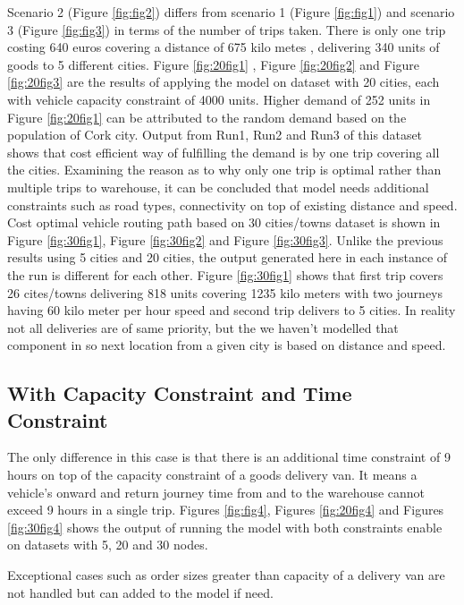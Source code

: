 \documentclass[a4paper,11pt]{article}
\begin{document}
Scenario 2 (Figure \ref{fig:fig2}) differs from scenario 1 (Figure \ref{fig:fig1}) and scenario 3 (Figure \ref{fig:fig3}) in terms of the number of trips taken. There is only one trip costing 640 euros covering a distance of 675 kilo metes , delivering 340 units of goods to 5 different cities. 
Figure \ref{fig:20fig1} , Figure \ref{fig:20fig2}  and Figure \ref{fig:20fig3} are the results of applying the model on dataset with 20 cities, each with vehicle capacity constraint of 4000 units. Higher demand of 252 units in Figure \ref{fig:20fig1} can be attributed to the random demand based on the population of Cork city. Output from Run1, Run2 and Run3 of this dataset shows that cost efficient way of fulfilling the demand is by one trip covering all the cities.
Examining the reason as to why only one trip is optimal rather than multiple trips to warehouse, it can be concluded that model needs additional constraints such as road types, connectivity on top of existing distance and speed.\\

Cost optimal vehicle routing path based on 30 cities/towns dataset is shown in Figure \ref{fig:30fig1}, Figure \ref{fig:30fig2} and Figure \ref{fig:30fig3}. Unlike the previous results using 5 cities and 20 cities, the output generated here in each instance of the run is different for each other. Figure \ref{fig:30fig1} shows that first trip covers 26 cites/towns delivering 818 units covering 1235 kilo meters with two journeys having 60 kilo meter per hour speed and second trip delivers to 5 cities. In reality not all deliveries are of same priority, but the we haven't modelled that component in so next location from a given city is based on distance and speed.  

\subsection{With Capacity Constraint and Time Constraint}

The only difference in this case is that there is an additional time constraint of 9 hours on top of the capacity constraint of a goods delivery van. It means a vehicle's onward and return journey time from and to the warehouse cannot exceed 9 hours in a single trip. Figures \ref{fig:fig4}, Figures \ref{fig:20fig4} and Figures \ref{fig:30fig4} shows the output of running the model with both constraints enable on datasets with 5, 20 and 30 nodes.


Exceptional cases such as order sizes greater than capacity of a delivery van are not handled but can added to the model if need. 
\end{document}
